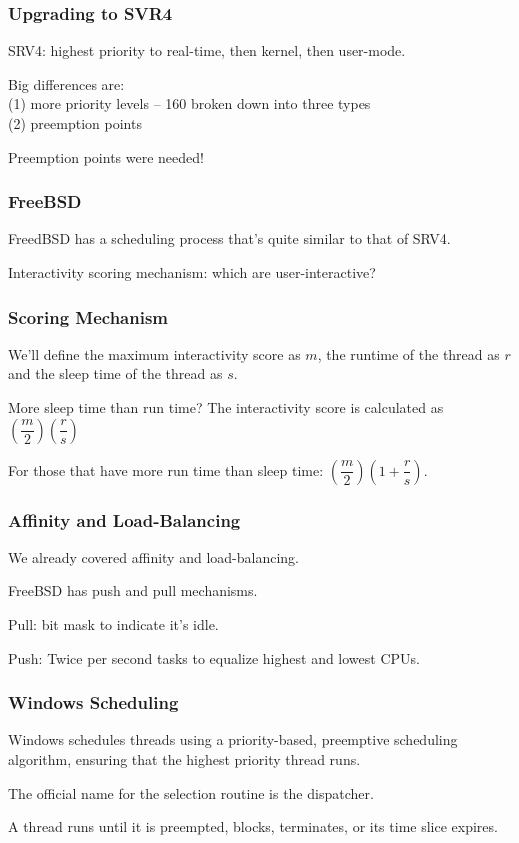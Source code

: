 \begin{frame}
\frametitle{Upgrading to SVR4}

SRV4: highest priority to real-time, then kernel, then user-mode.

Big differences are:\\
\quad (1) more priority levels -- 160 broken down into three types\\
\quad (2) preemption points

Preemption points were needed!

\end{frame}

\begin{frame}
\frametitle{FreeBSD}
FreedBSD has a scheduling process that's quite similar to that of SRV4.

Interactivity scoring mechanism: which are user-interactive?

\end{frame}

\begin{frame}
\frametitle{Scoring Mechanism}

We'll define the maximum interactivity score as $m$, the runtime of the thread as $r$ and the sleep time of the thread as $s$. 

More sleep time than run time? The interactivity score is calculated as $(\dfrac{m}{2})(\dfrac{r}{s})$

For those that have more run time than sleep time:
  $(\dfrac{m}{2})(1 + \dfrac{r}{s})$. 

\end{frame}

\begin{frame}
\frametitle{Affinity and Load-Balancing}

We already covered affinity and load-balancing.

FreeBSD has push and pull mechanisms.

Pull: bit mask to indicate it's idle.

Push: Twice per second tasks to equalize highest and lowest CPUs.


\end{frame}

\begin{frame}
\frametitle{Windows Scheduling}

Windows schedules threads using a priority-based, preemptive scheduling algorithm, ensuring that the highest priority thread runs. 

The official name for the selection routine is the \alert{dispatcher}.

A thread runs until it is preempted, blocks, terminates, or its time slice expires. 

\end{frame}

